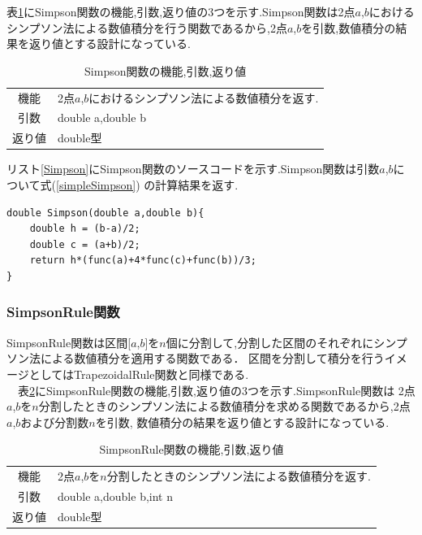 \documentclass[dvipdfmx]{jarticle}
\begin{document}
    表\ref{Simpsontable}にSimpson関数の機能,引数,返り値の3つを示す.Simpson関数は2点$a$,$b$における
    シンプソン法による数値積分を行う関数であるから,2点$a$,$b$を引数,数値積分の結果を返り値とする設計になっている.
    \begin{table}[H]
      \caption{Simpson関数の機能,引数,返り値}
      \label{Simpsontable}
      \begin{center}
          \begin{tabular}{c|l}\hline
        機能 & 2点$a$,$b$におけるシンプソン法による数値積分を返す.\\
        引数 & double a,double b\\
        返り値 & double型 \\ \hline
          \end{tabular}
      \end{center}
      \end{table}

      リスト\ref{Simpson}にSimpson関数のソースコードを示す.Simpson関数は引数$a$,$b$について式(\ref{simpleSimpson})
      の計算結果を返す.
      \begin{lstlisting}[basicstyle=\ttfamily\footnotesize, frame=single,label=Simpson,caption=Simpson関数]
double Simpson(double a,double b){
    double h = (b-a)/2;
    double c = (a+b)/2;
    return h*(func(a)+4*func(c)+func(b))/3;
}
      \end{lstlisting}

    \subsubsection{SimpsonRule関数}
    SimpsonRule関数は区間[$a$,$b$]を$n$個に分割して,分割した区間のそれぞれにシンプソン法による数値積分を適用する関数である．
    区間を分割して積分を行うイメージとしてはTrapezoidalRule関数と同様である.\\
    　表\ref{SimpsonRuleTtable}にSimpsonRule関数の機能,引数,返り値の3つを示す.SimpsonRule関数は
    2点$a$,$b$を$n$分割したときのシンプソン法による数値積分を求める関数であるから,2点$a$,$b$および分割数$n$を引数,
    数値積分の結果を返り値とする設計になっている.

    \begin{table}[H]
      \caption{SimpsonRule関数の機能,引数,返り値}
      \label{SimpsonRuleTtable}
      \begin{center}
          \begin{tabular}{c|l}\hline
        機能 & 2点$a$,$b$を$n$分割したときのシンプソン法による数値積分を返す.\\
        引数 & double a,double b,int n\\
        返り値 & double型 \\ \hline
          \end{tabular}
      \end{center}
      \end{table}
\end{document}
